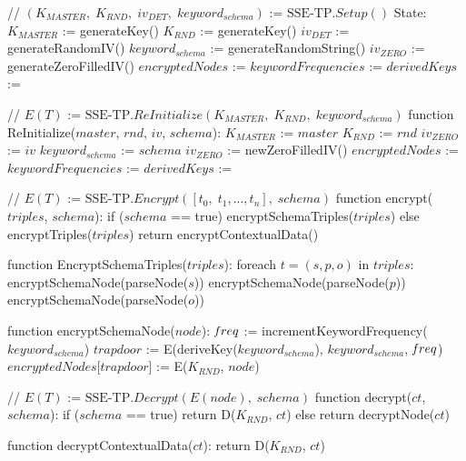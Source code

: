 
// $(K_{MASTER}, \; K_{RND}, \; iv_{DET}, \; keyword_{schema})$ := $\textrm{SSE-TP}.Setup()$
State:   
    $K_{MASTER}$ := generateKey() 
    $K_{RND}$ := generateKey() 
    $iv_{DET}$ := generateRandomIV()
    $keyword_{schema}$ := generateRandomString()
    $iv_{ZERO}$ := generateZeroFilledIV()
    $encryptedNodes$ := {}
    $keywordFrequencies$ := {}
    $derivedKeys$ := {} 
    
// $E(T)$ := $\textrm{SSE-TP}.ReInitialize(K_{MASTER}, \; K_{RND}, \; keyword_{schema})$
function ReInitialize($master$, $rnd$, $iv$, $schema$):  
    $K_{MASTER}$ := $master$ 
    $K_{RND}$ := $rnd$
    $iv_{ZERO}$ := $iv$
    $keyword_{schema}$ := $schema$
    $iv_{ZERO}$ := newZeroFilledIV()
    $encryptedNodes$ := {}
    $keywordFrequencies$ := {}
    $derivedKeys$ := {}

// $E(T)$ := $\textrm{SSE-TP}.Encrypt([t_0, \; t_1,  ... , t_n], \; schema)$
function encrypt($triples$, $schema$):
    if ($schema$ == true)
        encryptSchemaTriples($triples$)
    else
        encryptTriples($triples$)
    return encryptContextualData()

function EncryptSchemaTriples($triples$):
    foreach $t = (s,p,o)$ in $triples$:
        encryptSchemaNode(parseNode($s$))
        encryptSchemaNode(parseNode($p$))
        encryptSchemaNode(parseNode($o$))
        
function encryptSchemaNode($node$):
    $\textrm{\emph{f}}req$ := incrementKeywordFrequency($keyword_{schema}$)
    $trapdoor$ := E(deriveKey($keyword_{schema}$), $keyword_{schema}$, $\textrm{\emph{f}}req$)
    $encryptedNodes$[$trapdoor$] := E($K_{RND}$, $node$)


// $E(T)$ := $\textrm{SSE-TP}.Decrypt(E(node), \; schema)$
function decrypt($ct$, $schema$):
    if ($schema$ == true)
        return D($K_{RND}$, $ct$)
    else
        return decryptNode($ct$)

function decryptContextualData($ct$):
    return D($K_{RND}$, $ct$)
    
